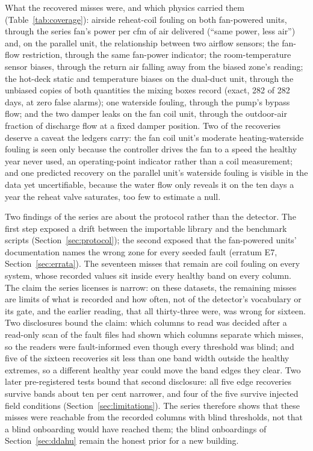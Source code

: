 \documentclass[11pt,letterpaper]{article}
\begin{document}
What the recovered misses were, and which physics carried them (Table~\ref{tab:coverage}): airside reheat-coil fouling on both fan-powered units, through the series fan's power per cfm of air delivered (``same power, less air'') and, on the parallel unit, the relationship between two airflow sensors; the fan-flow restriction, through the same fan-power indicator; the room-temperature sensor biases, through the return air falling away from the biased zone's reading; the hot-deck static and temperature biases on the dual-duct unit, through the unbiased copies of both quantities the mixing boxes record (exact, 282 of 282 days, at zero false alarms); one waterside fouling, through the pump's bypass flow; and the two damper leaks on the fan coil unit, through the outdoor-air fraction of discharge flow at a fixed damper position. Two of the recoveries deserve a caveat the ledgers carry: the fan coil unit's moderate heating-waterside fouling is seen only because the controller drives the fan to a speed the healthy year never used, an operating-point indicator rather than a coil measurement; and one predicted recovery on the parallel unit's waterside fouling is visible in the data yet uncertifiable, because the water flow only reveals it on the ten days a year the reheat valve saturates, too few to estimate a null.

Two findings of the series are about the protocol rather than the detector. The first step exposed a drift between the importable library and the benchmark scripts (Section~\ref{sec:protocol}); the second exposed that the fan-powered units' documentation names the wrong zone for every seeded fault (erratum E7, Section~\ref{sec:errata}). The seventeen misses that remain are coil fouling on every system, whose recorded values sit inside every healthy band on every column. The claim the series licenses is narrow: on these datasets, the remaining misses are limits of what is recorded and how often, not of the detector's vocabulary or its gate, and the earlier reading, that all thirty-three were, was wrong for sixteen. Two disclosures bound the claim: which columns to read was decided after a read-only scan of the fault files had shown which columns separate which misses, so the readers were fault-informed even though every threshold was blind; and five of the sixteen recoveries sit less than one band width outside the healthy extremes, so a different healthy year could move the band edges they clear. Two later pre-registered tests bound that second disclosure: all five edge recoveries survive bands about ten per cent narrower, and four of the five survive injected field conditions (Section~\ref{sec:limitations}). The series therefore shows that these misses were reachable from the recorded columns with blind thresholds, not that a blind onboarding would have reached them; the blind onboardings of Section~\ref{sec:ddahu} remain the honest prior for a new building.
\end{document}
